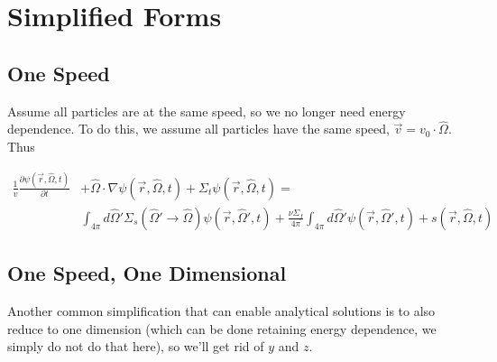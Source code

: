 \documentclass[12pt]{article}
\newcommand{\vOmega}{\ensuremath{\hat{\Omega}}}
\begin{document}
\section*{Simplified Forms}

\subsection*{One Speed}
Assume all particles are at the same speed, so we no longer need energy dependence. To do this, we assume all particles have the same speed, $\vec{v} = v_0 \cdot \vOmega$. Thus
%

\begin{align*}
\frac{1}{v}\frac{\partial \psi(\vec{r}, \vOmega, t)}{\partial t} &+ 
\vOmega \cdot \nabla \psi(\vec{r}, \vOmega, t) +
\Sigma_t \psi(\vec{r}, \vOmega, t) = \nonumber\\
%
& \int_{4\pi} d\vOmega' \Sigma_s(\vOmega' \rightarrow \vOmega) \psi(\vec{r}, \vOmega', t)  
+ \frac{\nu \Sigma_f}{4\pi} \int_{4\pi} d\vOmega' \psi(\vec{r},  \vOmega', t) 
+ s(\vec{r}, \vOmega, t) 
\end{align*}
%


\subsection*{One Speed, One Dimensional}

Another common simplification that can enable analytical solutions is to also reduce to one dimension (which can be done retaining energy dependence, we simply do not do that here), so we'll get rid of $y$ and $z$.
\end{document}

